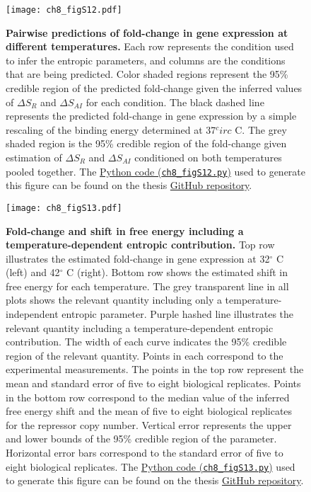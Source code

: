 \documentclass[12pt]{caltech_thesis}
\begin{document}
\hypertarget{fig:entropy_pairwise}{%
\begin{figure}
\centering
\texttt{[image: ch8\_figS12.pdf]}
\caption[{Pairwise predictions of fold-change in gene expression at
different temperatures.}]{\textbf{Pairwise predictions of fold-change in
gene expression at different temperatures.} Each row represents the
condition used to infer the entropic parameters, and columns are the
conditions that are being predicted. Color shaded regions represent the
95\% credible region of the predicted fold-change given the inferred
values of \(\Delta S_R\) and \(\Delta S_{AI}\) for each condition. The
black dashed line represents the predicted fold-change in gene
expression by a simple rescaling of the binding energy determined at
37\(^circ\) C. The grey shaded region is the 95\% credible region of the
fold-change given estimation of \(\Delta S_R\) and \(\Delta S_{AI}\)
conditioned on both temperatures pooled together. The
\href{https://github.com/gchure/phd/blob/master/src/chapter_08/code/ch8_figS12.py}{Python
code (\texttt{ch8\_figS12.py})} used to generate this figure can be
found on the thesis \href{https://github.com/gchure/phd}{GitHub
repository}.}
\label{fig:entropy_pairwise}
\end{figure}
}

\hypertarget{fig:t_dependent}{%
\begin{figure}
\centering
\texttt{[image: ch8\_figS13.pdf]}
\caption[{Fold-change and shift in free energy including a
temperature-dependent entropic contribution.}]{\textbf{Fold-change and
shift in free energy including a temperature-dependent entropic
contribution.} Top row illustrates the estimated fold-change in gene
expression at 32\(^\circ\) C (left) and 42\(^\circ\) C (right). Bottom
row shows the estimated shift in free energy for each temperature. The
grey transparent line in all plots shows the relevant quantity including
only a temperature-independent entropic parameter. Purple hashed line
illustrates the relevant quantity including a temperature-dependent
entropic contribution. The width of each curve indicates the 95\%
credible region of the relevant quantity. Points in each correspond to
the experimental measurements. The points in the top row represent the
mean and standard error of five to eight biological replicates. Points
in the bottom row correspond to the median value of the inferred free
energy shift and the mean of five to eight biological replicates for the
repressor copy number. Vertical error represents the upper and lower
bounds of the 95\% credible region of the parameter. Horizontal error
bars correspond to the standard error of five to eight biological
replicates. The
\href{https://github.com/gchure/phd/blob/master/src/chapter_08/code/ch8_figS13.py}{Python
code (\texttt{ch8\_figS13.py})} used to generate this figure can be
found on the thesis \href{https://github.com/gchure/phd}{GitHub
repository}.}
\label{fig:t_dependent}
\end{figure}
}
\end{document}
